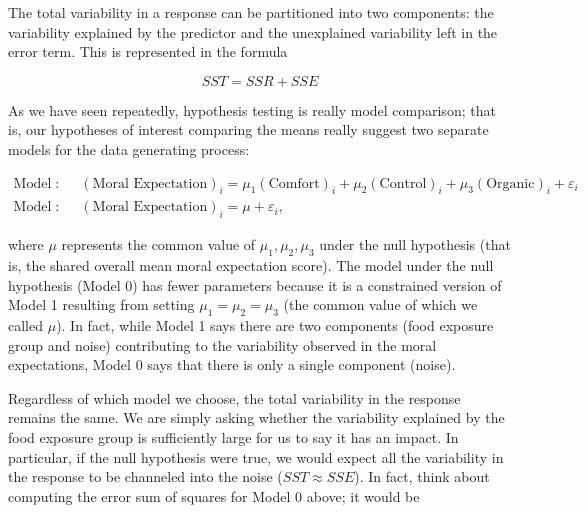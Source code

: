 \documentclass[
  letterpaper,
  DIV=11,
  numbers=noendperiod]{scrreprt}
\theoremstyle{definition}
\theoremstyle{definition}
\theoremstyle{plain}
\theoremstyle{remark}
\begin{document}
\begin{tcolorbox}[enhanced jigsaw, colbacktitle=quarto-callout-tip-color!10!white, colback=white, left=2mm, title=\textcolor{quarto-callout-tip-color}{\faLightbulb}\hspace{0.5em}{Big Idea}, toptitle=1mm, leftrule=.75mm, breakable, bottomrule=.15mm, arc=.35mm, rightrule=.15mm, toprule=.15mm, coltitle=black, opacityback=0, colframe=quarto-callout-tip-color-frame, opacitybacktitle=0.6, bottomtitle=1mm, titlerule=0mm]

The total variability in a response can be partitioned into two
components: the variability explained by the predictor and the
unexplained variability left in the error term. This is represented in
the formula

\[SST = SSR + SSE\]

\end{tcolorbox}

As we have seen repeatedly, hypothesis testing is really model
comparison; that is, our hypotheses of interest comparing the means
really suggest two separate models for the data generating process:

\[
\begin{aligned}
  \text{Model 1}:& \quad (\text{Moral Expectation})_i = \mu_1 (\text{Comfort})_i + \mu_2 (\text{Control})_i + \mu_3 (\text{Organic})_i + \varepsilon_i \\
  \text{Model 0}:& \quad (\text{Moral Expectation})_i = \mu + \varepsilon_i,
\end{aligned}
\]

where \(\mu\) represents the common value of \(\mu_1, \mu_2, \mu_3\)
under the null hypothesis (that is, the shared overall mean moral
expectation score). The model under the null hypothesis (Model 0) has
fewer parameters because it is a constrained version of Model 1
resulting from setting \(\mu_1 = \mu_2 = \mu_3\) (the common value of
which we called \(\mu\)). In fact, while Model 1 says there are two
components (food exposure group and noise) contributing to the
variability observed in the moral expectations, Model 0 says that there
is only a single component (noise).

Regardless of which model we choose, the total variability in the
response remains the same. We are simply asking whether the variability
explained by the food exposure group is sufficiently large for us to say
it has an impact. In particular, if the null hypothesis were true, we
would expect all the variability in the response to be channeled into
the noise (\(SST \approx SSE\)). In fact, think about computing the
error sum of squares for Model 0 above; it would be
\end{document}
